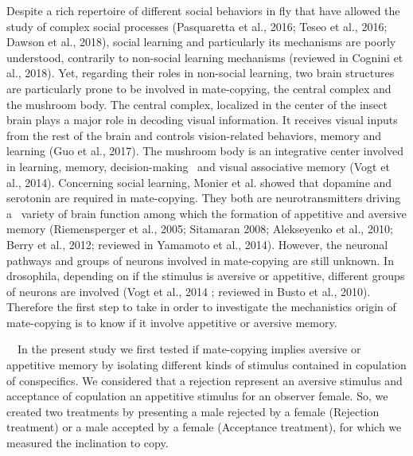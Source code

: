 \documentclass{article}
\begin{document}
Despite a rich repertoire of different social behaviors in fly that have allowed the study of complex social processes (Pasquaretta et al., 2016; Teseo et al., 2016; Dawson et al., 2018), social learning and particularly its mechanisms are poorly understood, contrarily to non-social learning mechanisms (reviewed in Cognini et al., 2018). Yet, regarding their roles in non-social learning, two brain structures are particularly prone to be involved in mate-copying, the central complex and the mushroom body. The central complex, localized in the center of the insect brain plays a major role in decoding visual information. It receives visual inputs from the rest of the brain and controls vision-related behaviors, memory and learning (Guo et al., 2017). The mushroom body is an integrative center involved in learning, memory, decision-making \ and visual associative memory (Vogt et al., 2014). Concerning social learning, Monier et al. showed that dopamine and serotonin are required in mate-copying. They both are neurotransmitters driving a \ variety of brain function among which the formation of appetitive and aversive memory (Riemensperger et al., 2005; Sitamaran 2008; Alekseyenko et al., 2010; Berry et al., 2012; reviewed in Yamamoto et al., 2014). However, the neuronal pathways and groups of neurons involved in mate-copying are still unknown. In drosophila, depending on if the stimulus is aversive or appetitive, different groups of neurons are involved (Vogt et al., 2014 ; reviewed in Busto et al., 2010). Therefore the first step to take in order to investigate the mechanistics origin of mate-copying is to know if it involve appetitive or aversive memory.


\bigskip

\ \ In the present study we first tested if mate-copying implies aversive or appetitive memory by isolating different kinds of stimulus contained in copulation of conspecifics. We considered that a rejection represent an aversive stimulus and acceptance of copulation an appetitive stimulus for an observer female. So, we created two treatments by presenting a male rejected by a female ({\textquotedbl}Rejection{\textquotedbl} treatment) or a male accepted by a female ({\textquotedbl}Acceptance{\textquotedbl} treatment), for which we measured the inclination to copy.


\bigskip
\end{document}
